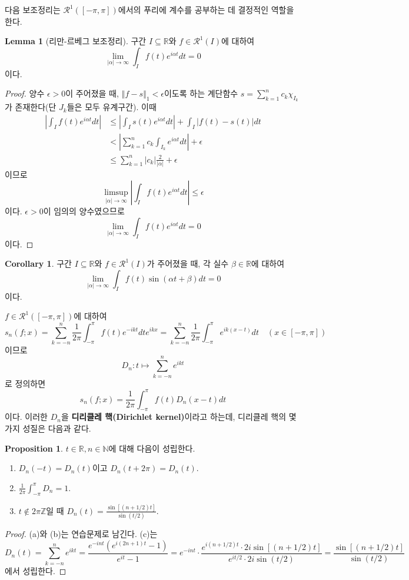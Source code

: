 \documentclass[11pt]{book}
\numberwithin{equation}{chapter}
\def\NN{\mathbb{N}}
\def\ZZ{\mathbb{Z}}
\def\RR{\mathbb{R}}
\def\eps{\epsilon}
\def\calR{\mathcal{R}}
\newcommand{\abs}[1]{\left\vert#1\right\vert}
\newcommand{\norm}[1]{\left\Vert#1\right\Vert}
\theoremstyle{definition}
\newtheorem{cor}[thm]{Corollary}
\newtheorem{lem}[thm]{Lemma}
\newtheorem{prop}[thm]{Proposition}
\newenvironment{enum}
	{\begin{enumerate}[label=(\alph*), leftmargin=2\parindent]}
	{\end{enumerate}}
\begin{document}
다음 보조정리는 \(\calR^1([-\pi, \pi])\)에서의 푸리에 계수를 공부하는 데 결정적인 역할을 한다.

\begin{lem}[리만-르베그 보조정리]
    구간 \(I \subseteq \RR\)와 \(f \in \calR^1(I)\)에 대하여
    \[
        \lim_{\abs{\alpha} \to \infty} \int_I f(t) e^{i\alpha t} dt = 0
    \]
    이다.
\end{lem}
\begin{proof}
    양수 \(\eps > 0\)이 주어졌을 때, \(\norm{f - s}_1 < \eps\)이도록 하는 계단함수 \(s = \sum_{k=1}^n c_k \chi_{I_k}\)가 존재한다(단 \(J_k\)들은 모두 유계구간). 이때
    \begin{align*}
        \abs{\int_I f(t) e^{i\alpha t} dt} &\le \abs{\int_I s(t) e^{i\alpha t} dt} + \int_I \abs{f(t) - s(t)} dt\\
        &< \abs{\sum_{k=1}^n c_k \int_{I_k} e^{i\alpha t} dt} + \eps\\
        &\le \sum_{k=1}^n \abs{c_k} \frac{2}{\abs{\alpha}} + \eps
    \end{align*}
    이므로
    \[
        \limsup_{\abs{\alpha} \to \infty} \abs{\int_I f(t) e^{i\alpha t} dt} \le \eps
    \]
    이다. \(\eps > 0\)이 임의의 양수였으므로
    \[
        \lim_{\abs{\alpha} \to \infty} \int_I f(t) e^{i\alpha t} dt = 0
    \]
    이다.
\end{proof}

\begin{cor}
    구간 \(I \subseteq \RR\)와 \(f \in \calR^1(I)\)가 주어졌을 때, 각 실수 \(\beta \in \RR\)에 대하여
    \[
        \lim_{\abs{\alpha} \to \infty} \int_I f(t) \sin(\alpha t  + \beta) dt = 0
    \]
    이다.
\end{cor}

\(f \in \calR^1([-\pi, \pi])\)에 대하여
\[
    s_n(f; x) = \sum_{k=-n}^n \frac{1}{2\pi} \int_{-\pi}^\pi f(t) e^{-ikt} dt e^{ikx} = \sum_{k=-n}^n \frac{1}{2\pi} \int_{-\pi}^\pi e^{ik(x-t)}dt \quad (x \in [-\pi, \pi])
\]
이므로
\[
    D_n : t \mapsto \sum_{k=-n}^n e^{ikt}
\]
로 정의하면
\[
    s_n(f; x) = \frac{1}{2\pi} \int_{-\pi}^\pi f(t) D_n(x-t) dt
\]
이다. 이러한 \(D_n\)을 \textbf{디리클레 핵(Dirichlet kernel)}이라고 하는데, 디리클레 핵의 몇 가지 성질은 다음과 같다.

\begin{prop} \label{15.2.3}
    \(t \in \RR, n \in \NN\)에 대해 다음이 성립한다.
    \begin{enum}
        \item \(D_n(-t) = D_n(t)\)이고 \(D_n(t+2\pi) = D_n(t)\).
        \item \(\displaystyle \frac{1}{2\pi} \int_{-\pi}^\pi D_n = 1\).
        \item \(t \notin 2\pi\ZZ\)일 때 \(\displaystyle D_n(t) = \frac{\sin [(n + 1/2)t]}{\sin (t/2)}\).
    \end{enum} 
\end{prop}
\begin{proof}
    (a)와 (b)는 연습문제로 남긴다. (c)는
    \[
        D_n(t) = \sum_{k=-n}^n e^{ikt} = \frac{e^{-int}(e^{i(2n+1)t} - 1)}{e^{it} - 1} = e^{-int} \cdot \frac{e^{i(n+1/2)t} \cdot 2i \sin [(n+1/2)t]}{e^{it/2} \cdot 2i \sin (t/2)} = \frac{\sin [(n + 1/2)t]}{\sin (t/2)}
    \]
    에서 성립한다.
\end{proof}
\end{document}
